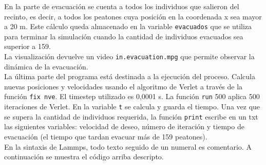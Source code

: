 En la parte de evacuación se cuenta a todos los individuos que salieron del recinto, es decir, a todos los peatones cuya posición en la coordenada x sea mayor a 20 m. Este cálculo queda almacenado en la variable {\tt evacuados} que se utiliza para terminar la simulación cuando la cantidad de individuos evacuados sea superior a 159. \\
La visualización devuelve un video {\tt in.evacuation.mpg} que permite observar la dinámica de la evacuación. \\

La última parte del programa está destinada a la ejecución del proceso. Calcula nuevas posiciones y velocidades usando el algoritmo de Verlet a través de la función {\tt fix nve}. El timestep utilizado es 0,0001 s. La función {\tt run} 500 aplica 500 iteraciones de Verlet. En la variable {\tt t} se calcula y guarda el tiempo. Una vez que se supera la cantidad de individuos requerida, la función {\tt print} escribe en un txt las siguientes variables: velocidad de deseo, número de iteración y tiempo de evacuación (el tiempo que tardan evacuar más de 159 peatones).\\

En la sintaxis de Lammps, todo texto seguido de un numeral es comentario. A continuación se muestra el código arriba descripto.

